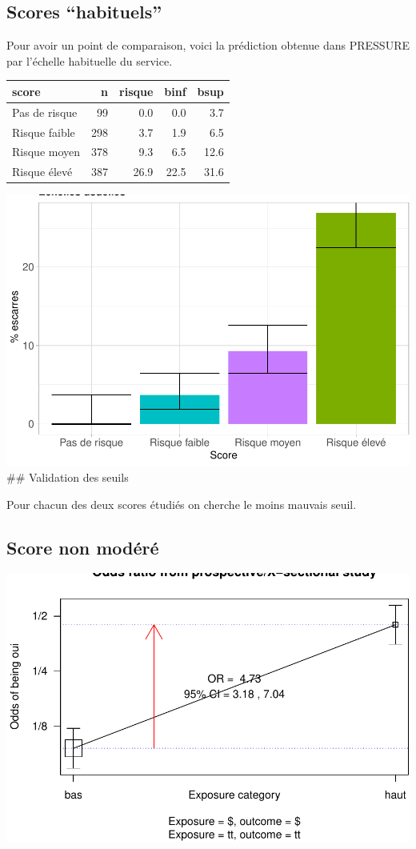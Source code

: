 \documentclass[]{article}
\begin{document}
\hypertarget{scores-habituels}{%
\subsection{Scores ``habituels''}\label{scores-habituels}}

Pour avoir un point de comparaison, voici la prédiction obtenue dans
PRESSURE par l'échelle habituelle du service.

\begin{tabular}{lrrrr}
\toprule
score & n & risque & binf & bsup\\
\midrule
Pas de risque & 99 & 0.0 & 0.0 & 3.7\\
Risque faible & 298 & 3.7 & 1.9 & 6.5\\
Risque moyen & 378 & 9.3 & 6.5 & 12.6\\
Risque élevé & 387 & 26.9 & 22.5 & 31.6\\
\bottomrule
\end{tabular}

\includegraphics{book_escarre_files/figure-latex/schab-1.pdf} \#\#
Validation des seuils

Pour chacun des deux scores étudiés on cherche le moins mauvais seuil.

\hypertarget{score-non-modere}{%
\subsection{Score non modéré}\label{score-non-modere}}

\includegraphics{book_escarre_files/figure-latex/seuil1-1.pdf}
\end{document}
